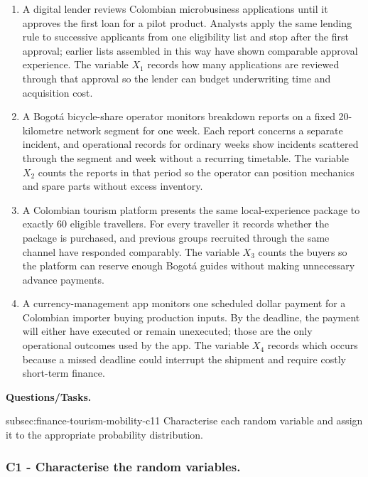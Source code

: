 	\begin{enumerate}
		\item A digital lender reviews Colombian microbusiness applications until it approves the first loan for a pilot product. Analysts apply the same lending rule to successive applicants from one eligibility list and stop after the first approval; earlier lists assembled in this way have shown comparable approval experience. The variable \(X_1\) records how many applications are reviewed through that approval so the lender can budget underwriting time and acquisition cost.
		\item A Bogotá bicycle-share operator monitors breakdown reports on a fixed 20-kilometre network segment for one week. Each report concerns a separate incident, and operational records for ordinary weeks show incidents scattered through the segment and week without a recurring timetable. The variable \(X_2\) counts the reports in that period so the operator can position mechanics and spare parts without excess inventory.
		\item A Colombian tourism platform presents the same local-experience package to exactly 60 eligible travellers. For every traveller it records whether the package is purchased, and previous groups recruited through the same channel have responded comparably. The variable \(X_3\) counts the buyers so the platform can reserve enough Bogotá guides without making unnecessary advance payments.
		\item A currency-management app monitors one scheduled dollar payment for a Colombian importer buying production inputs. By the deadline, the payment will either have executed or remain unexecuted; those are the only operational outcomes used by the app. The variable \(X_4\) records which occurs because a missed deadline could interrupt the shipment and require costly short-term finance.
	\end{enumerate}

	\textbf{Questions/Tasks.}
	\begin{enumerate}
		\CriterionTask
		{subsec:finance-tourism-mobility-c1}{1}
		{Characterise each random variable and assign it to the appropriate probability distribution.}
	\end{enumerate}

	\subsubsection*{C1 - Characterise the random variables.}
	\label{subsec:finance-tourism-mobility-c1}

